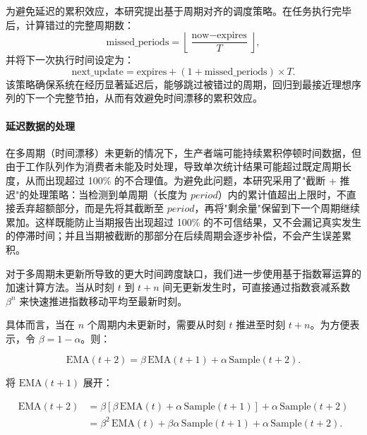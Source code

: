 为避免延迟的累积效应，本研究提出基于周期对齐的调度策略。在任务执行完毕后，计算错过的完整周期数：
\[
\text{missed\_periods} = \left\lfloor \frac{\text{now} - \text{expires}}{T} \right\rfloor,
\]
并将下一次执行时间设定为：
\[
\text{next\_update} = \text{expires} + (1 + \text{missed\_periods}) \times T.
\]
该策略确保系统在经历显著延迟后，能够跳过被错过的周期，回归到最接近理想序列的下一个完整节拍，从而有效避免时间漂移的累积效应。

\paragraph{延迟数据的处理}

在多周期（时间漂移）未更新的情况下，生产者端可能持续累积停顿时间数据，但由于工作队列作为消费者未能及时处理，导致单次统计结果可能超过既定周期长度，从而出现超过 100\% 的不合理值。为避免此问题，本研究采用了"截断 + 推迟"的处理策略：当检测到单周期（长度为 \(\textit{period}\)）内的累计值超出上限时，不直接丢弃超额部分，而是先将其截断至 \(\textit{period}\)，再将"剩余量"保留到下一个周期继续累加。这样既能防止当期报告出现超过 100\% 的不可信结果，又不会漏记真实发生的停滞时间；并且当期被截断的那部分在后续周期会逐步补偿，不会产生误差累积。

对于多周期未更新所导致的更大时间跨度缺口，我们进一步使用基于指数幂运算的加速计算方法。当从时刻 \(t\) 到 \(t+n\) 间无更新发生时，可直接通过指数衰减系数 \(\beta^n\) 来快速推进指数移动平均至最新时刻。

具体而言，当在 \(n\) 个周期内未更新时，需要从时刻 \(t\) 推进至时刻 \(t+n\)。为方便表示，令 \(\beta = 1-\alpha\)。则：

\begin{equation}
\text{EMA}(t+2) = \beta \,\text{EMA}(t+1) + \alpha \,\text{Sample}(t+2).
\end{equation}

将 \(\text{EMA}(t+1)\) 展开：

\begin{equation}
\begin{aligned}
\text{EMA}(t+2)
&= \beta \left[\beta\,\text{EMA}(t) + \alpha\,\text{Sample}(t+1)\right] + \alpha\,\text{Sample}(t+2) \\
&= \beta^2 \,\text{EMA}(t) + \beta \alpha\,\text{Sample}(t+1) + \alpha\,\text{Sample}(t+2).
\end{aligned}
\end{equation}

